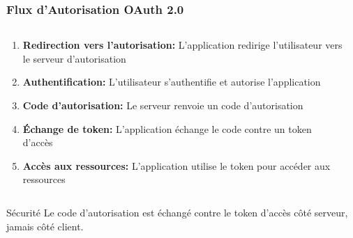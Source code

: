 \documentclass[aspectratio=169]{beamer}
\begin{document}
\begin{frame}
    \frametitle{\faExchangeAlt \quad Flux d'Autorisation OAuth 2.0}
    \begin{columns}
        \begin{column}{0.6\textwidth}
            \begin{enumerate}
                \item \textcolor{primaryblue}{\textbf{Redirection vers l'autorisation:}} L'application redirige l'utilisateur vers le serveur d'autorisation
                \item \textcolor{accentgreen}{\textbf{Authentification:}} L'utilisateur s'authentifie et autorise l'application
                \item \textcolor{warningorange}{\textbf{Code d'autorisation:}} Le serveur renvoie un code d'autorisation
                \item \textcolor{errorred}{\textbf{Échange de token:}} L'application échange le code contre un token d'accès
                \item \textcolor{primaryblue}{\textbf{Accès aux ressources:}} L'application utilise le token pour accéder aux ressources
            \end{enumerate}
        \end{column}
        \begin{column}{0.4\textwidth}
            \begin{center}
            \end{center}
        \end{column}
    \end{columns}
    
    \vspace{0.5cm}
    \begin{alertblock}{\faLock \quad Sécurité}
        Le code d'autorisation est échangé contre le token d'accès côté serveur, jamais côté client.
    \end{alertblock}
\end{frame}
\end{document}
